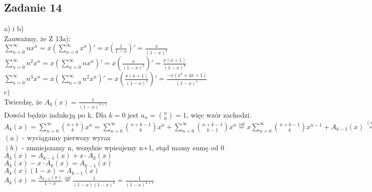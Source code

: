 \documentclass[a4paper]{article}
\begin{document}
\subsection*{Zadanie 14}
a) i b)\\
Zauważmy, że Z 13a):\\
$\sum_{n=0}^{\infty} n x^n = x (\sum_{n=0}^{\infty} x^n)' = x (\frac 1 {1 - x})' = \frac x {(1-x)^2}$\\
$\sum_{n=0}^{\infty} n^2 x^n = x (\sum_{n=0}^{\infty} n x^n)' = x (\frac x {(1-x)^2})' = \frac {x(x+1)} {(1-x)^3}$\\
$\sum_{n=0}^{\infty} n^3 x^n = x (\sum_{n=0}^{\infty} n^2 x^n)' = x (\frac {x(x+1)} {(1-x)^3})' = \frac {-x(x^2 + 4x +1)} {(1-x)^4}$\\
c)\\
Twierdzę, że $A_k(x) = \frac{1}{(1-x)^{k+1}}$\\
Dowód będzie indukcją po k. Dla $k = 0$ jest $a_n = {n \choose 0} = 1$, więc wzór zachodzi.\\
$A_k(x) = \sum\limits_{n=0}^{\infty} {n+k \choose k} x^n = \sum\limits_{n=0}^{\infty} {n+k-1 \choose k} x^n + \sum\limits_{n=0}^{\infty} {n+k-1 \choose k-1} x^n \stackrel{zal}{=} x \sum\limits_{n=0}^{\infty} {n+k-1 \choose k} x^{n-1} + A_{k-1}(x) \stackrel{(a)}{=} x x^{-1}{k-1 \choose k} + x \sum\limits_{n=1}^{\infty} {n+k-1 \choose k} x^{n-1} + A_{k-1}(x) \stackrel{(b)}{=} x \sum\limits_{n=0}^{\infty} {n+k \choose k} x^n + A_{k-1}(x) = x \cdot A_k(x) + A_{k-1}(x)$\\
$(a)$ - wyciągamy pierwszy wyraz\\
$(b)$ - zmniejszamy n, wszędzie wpisujemy n+1, stąd mamy sumę od 0\\
$A_k(x) = A_{k-1}(x) + x\cdot A_{k}(x)$\\
$A_k(x) - x\cdot A_{k}(x) = A_{k-1}(x)$\\
$A_k(x) (1 - x) = A_{k-1}(x)$\\
$A_k(x) = \frac{A_{k-1}(x)}{1-x} \stackrel{zal}{=} \frac{1}{(1-x)(1-x)^{k}} = \frac{1}{(1-x)^{k+1}}$\\
\end{document}
